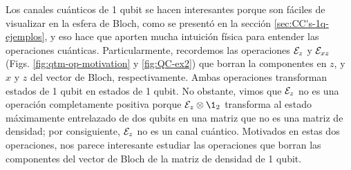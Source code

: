 

Los canales cuánticos de 1 qubit se hacen interesantes porque 
son fáciles de visualizar en la esfera de Bloch, como se presentó
en la sección \ref{sec:CC's-1q-ejemplos}, y eso hace que 
aporten mucha intuición física para entender las operaciones cuánticas. 
Particularmente, recordemos 
las operaciones $\mathcal{E}_z$ y $\mathcal{E}_{xz}$ (Figs. \ref{fig:qtm-op-motivation}
y \ref{fig:QC-ex2}) que borran la componentes en $z$, y 
$x$ y $z$ del vector de Bloch, respectivamente. Ambas operaciones
transforman estados de 1 qubit en estados de 1 qubit. No obstante, 
vimos que $\mathcal{E}_z$ no es una operación completamente positiva porque 
$\E_z\otimes\1 _2$ transforma al estado máximamente entrelazado de 
dos qubits en una matriz que no es una matriz de densidad;
por consiguiente, $\mathcal{E}_z$ no es un canal cuántico. 
Motivados en estas dos operaciones, nos parece interesante 
estudiar las operaciones que borran las componentes del 
vector de Bloch de la matriz de densidad de 1 qubit.

